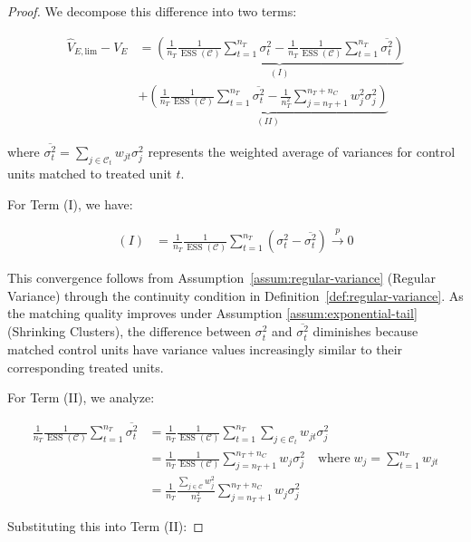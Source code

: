 \documentclass{mytemplate}
\begin{document}
\begin{proof}
We decompose this difference into two terms:

$$
\begin{aligned} 
\hat{V}_{E, \text{lim}}-V_E &= \underbrace{\left(\frac{1}{n_T} \frac{1}{\operatorname{ESS}(\mathcal{C})} \sum_{t=1}^{n_T} \sigma_t^2-\frac{1}{n_T} \frac{1}{\operatorname{ESS}(\mathcal{C})} \sum_{t=1}^{n_T} \overline{\sigma_t^2}\right)}_{(I)} \\ 
&+ \underbrace{\left(\frac{1}{n_T} \frac{1}{\operatorname{ESS}(\mathcal{C})} \sum_{t=1}^{n_T} \overline{\sigma_t^2}-\frac{1}{n_T^2} \sum_{j=n_T+1}^{n_T+n_C} w_j^2 \sigma_j^2\right)}_{(II)}
\end{aligned}
$$

where $\overline{\sigma_t^2} = \sum_{j \in \mathcal{C}_t} w_{jt} \sigma_j^2$ represents the weighted average of variances for control units matched to treated unit $t$.

For Term (I), we have:

$$
\begin{aligned}
(I)&=\frac{1}{n_T} \frac{1}{\operatorname{ESS}(\mathcal{C})} \sum_{t=1}^{n_T}\left(\sigma_t^2-\overline{\sigma_t^2}\right) \xrightarrow{p} 0
\end{aligned}
$$

This convergence follows from Assumption~\ref{assum:regular-variance} (Regular Variance) through the continuity condition in Definition~\ref{def:regular-variance}. As the matching quality improves under Assumption \ref{assum:exponential-tail} (Shrinking Clusters), the difference between $\sigma_t^2$ and $\overline{\sigma_t^2}$ diminishes because matched control units have variance values increasingly similar to their corresponding treated units.

For Term (II), we analyze:

$$
\begin{aligned}
\frac{1}{n_T} \frac{1}{\operatorname{ESS}(\mathcal{C})} \sum_{t=1}^{n_T} \overline{\sigma_t^2} 
&= \frac{1}{n_T} \frac{1}{\operatorname{ESS}(\mathcal{C})} \sum_{t=1}^{n_T} \sum_{j \in \mathcal{C}_t} w_{jt} \sigma_j^2 \\
&= \frac{1}{n_T} \frac{1}{\operatorname{ESS}(\mathcal{C})} \sum_{j=n_T+1}^{n_T+n_C} w_j \sigma_j^2 \quad \text{where} \; w_j=\sum_{t=1}^{n_T} w_{jt} \\
&= \frac{1}{n_T} \frac{\sum_{j \in \mathcal{C}} w_j^2}{n_T^2} \sum_{j=n_T+1}^{n_T+n_C} w_j \sigma_j^2 
\end{aligned}
$$

Substituting this into Term (II):


\end{proof}
\end{document}
